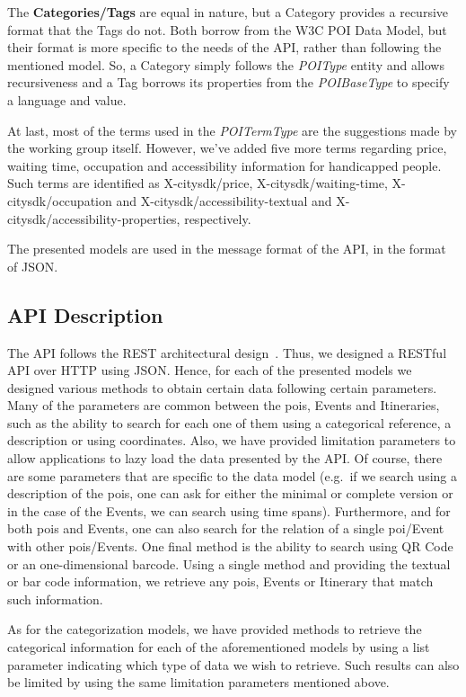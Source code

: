 \documentclass[times,doublespace]{ettauth}%
\begin{document}
The \textbf{Categories/Tags} are equal in nature, but a Category provides a recursive format that the Tags do not. Both borrow from the W3C POI Data Model, but their format is more specific to the needs of the API, rather than following the mentioned model. So, a Category simply follows the \textit{POIType} entity and allows recursiveness and a Tag borrows its properties from the \textit{POIBaseType} to specify a language and value.

At last, most of the terms used in the \textit{POITermType} are the suggestions made by the working group itself. However, we've added five more terms regarding price, waiting time, occupation and accessibility information for handicapped people. Such terms are identified as X-citysdk/price, X-citysdk/waiting-time, X-citysdk/occupation and X-citysdk/accessibility-textual and X-citysdk/accessibility-properties, respectively.

The presented models are used in the message format of the API, in the format of \ac{JSON}.

\subsection{API Description}
\label{s:api-description}
The API follows the \ac{REST} architectural design~\cite{Fielding:2002:PDM:514183.514185}. Thus, we designed a RESTful API over HTTP using \ac{JSON}. Hence, for each of the presented models we designed various methods to obtain certain data following certain parameters. Many of the parameters are common between the \acp{poi}, Events and Itineraries, such as the ability to search for each one of them using a categorical reference, a description or using coordinates. Also, we have provided limitation parameters to allow applications to lazy load the data presented by the API\@. Of course, there are some parameters that are specific to the data model (e.g.\ if we search using a description of the \acp{poi}, one can ask for either the minimal or complete version or in the case of the Events, we can search using time spans). Furthermore, and for both \acp{poi} and Events, one can also search for the relation of a single \ac{poi}/Event with other \acp{poi}/Events. One final method is the ability to search using QR Code or an one-dimensional barcode. Using a single method and providing the textual or bar code information, we retrieve any \acp{poi}, Events or Itinerary that match such information. %

As for the categorization models, we have provided methods to retrieve the categorical information for each of the aforementioned models by using a list parameter indicating which type of data we wish to retrieve. Such results can also be limited by using the same limitation parameters mentioned above.
\end{document}
